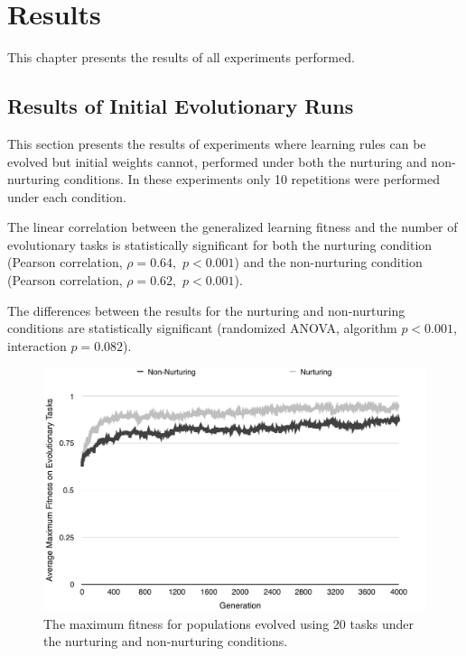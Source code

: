 \documentclass[master]{outhesis}
\begin{document}
\chapter{Results}

This chapter presents the results of all experiments performed.

\section{Results of Initial Evolutionary Runs}

This section presents the results of experiments where learning rules can be evolved but initial weights cannot, performed under both the nurturing and non-nurturing conditions.
In these experiments only 10 repetitions were performed under each condition.

The linear correlation between the generalized learning fitness and the number of evolutionary tasks is statistically significant for both
the nurturing condition (Pearson correlation, $\rho=0.64,$ $p < 0.001$)
and the non-nurturing condition (Pearson correlation, $\rho=0.62,$ $p < 0.001$).

The differences between the results for the nurturing and non-nurturing conditions are statistically significant (randomized ANOVA, algorithm $p < 0.001$, interaction $p = 0.082$).

\begin{figure}[H]
	\centering
	\includegraphics{ChalmersEvolution.pdf}
	\caption{The maximum fitness for populations evolved using 20 tasks under the nurturing and non-nurturing conditions.}
	\label{fig:ChalmersEvolution}
\end{figure}
\end{document}
